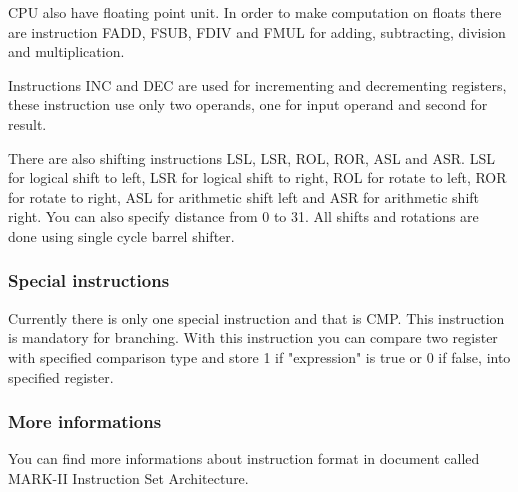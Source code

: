 CPU also have floating point unit. In order to make computation on floats there
are instruction FADD, FSUB, FDIV and FMUL for adding, subtracting, division
and multiplication.

Instructions INC and DEC are used for incrementing and decrementing registers,
these instruction use only two operands, one for input operand and second for
result.

There are also shifting instructions LSL, LSR, ROL, ROR, ASL and ASR. LSL for
logical shift to left, LSR for logical shift to right, ROL for rotate to left,
ROR for rotate to right, ASL for arithmetic shift left and ASR for arithmetic
shift right. You can also specify distance from 0 to 31. All shifts and rotations
are done using single cycle barrel shifter.

\subsubsection{Special instructions}

Currently there is only one special instruction and that is CMP. This
instruction is mandatory for branching. With this instruction you can compare
two register with specified comparison type and store 1 if "expression" is true
or 0 if false, into specified register.

\subsubsection{More informations}

You can find more informations about instruction format in document called
MARK-II Instruction Set Architecture.
